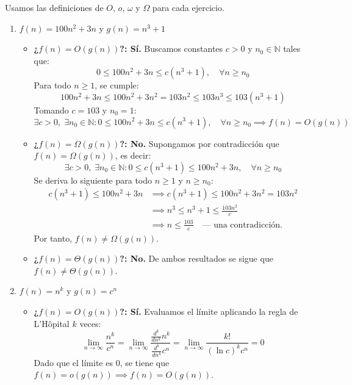 Usamos las definiciones de $O$, $o$, $\omega$ y $\Omega$ para cada ejercicio.

\begin{enumerate}
    \item $f(n) = 100n^2 + 3n$ y $g(n) = n^3 + 1$
    \begin{itemize}
        \item \textbf{¿$f(n) = O(g(n))$?: Sí.}  
        Buscamos constantes $c > 0$ y $n_0 \in \mathbb{N}$ tales que:
        \[
        0 \le 100n^2 + 3n \le c(n^3 + 1), \quad \forall n \ge n_0
        \]
        Para todo $n \ge 1$, se cumple:
        \[
        100n^2 + 3n \le 100n^2 + 3n^2 = 103n^2 \le 103n^3 \le 103(n^3 + 1)
        \]
        Tomando $c = 103$ y $n_0 = 1$:
        \[
        \exists c > 0, \; \exists n_0 \in \mathbb{N} : 0 \le 100n^2 + 3n \le c(n^3 + 1), \quad \forall n \ge n_0 \implies f(n) = O(g(n))
        \]
    
        \item \textbf{¿$f(n) = \Omega(g(n))$?: No.}  
        Supongamos por contradicción que $f(n) = \Omega(g(n))$, es decir:
        \[
        \exists c > 0, \; \exists n_0 \in \mathbb{N} : 0 \le c(n^3 + 1) \le 100n^2 + 3n, \quad \forall n \ge n_0
        \]
        Se deriva lo siguiente para todo $n \ge 1$ y $n \ge n_0$:
        \begin{align*}
        c(n^3 + 1) \le 100n^2 + 3n 
        &\implies c(n^3 + 1) \le 100n^2 + 3n^2 = 103n^2 \\
        &\implies n^3 \le n^3 + 1 \le \frac{103n^2}{c} \\
        &\implies n \le \frac{103}{c} \quad \text{--- una contradicción.}
        \end{align*}
        Por tanto, $f(n) \neq \Omega(g(n))$.
    
        \item \textbf{¿$f(n) = \Theta(g(n))$?: No.}  
        De ambos resultados se sigue que $f(n) \neq \Theta(g(n))$.
    \end{itemize}

    \item $f(n) = n^k$ y $g(n) = c^n$
    \begin{itemize}
        \item \textbf{¿$f(n) = O(g(n))$?: Sí.}  
        Evaluamos el límite aplicando la regla de L'Hôpital $k$ veces:
        \[
        \lim_{n \to \infty} \frac{n^k}{c^n} 
        = \lim_{n \to \infty} \frac{\frac{d^k}{dn^k} n^k}{\frac{d^k}{dn^k} c^n} 
        = \lim_{n \to \infty} \frac{k!}{(\ln c)^k c^n} = 0
        \]
        Dado que el límite es $0$, se tiene que $f(n) = o(g(n)) \implies f(n) = O(g(n))$.
    

\end{itemize}
\end{enumerate}
